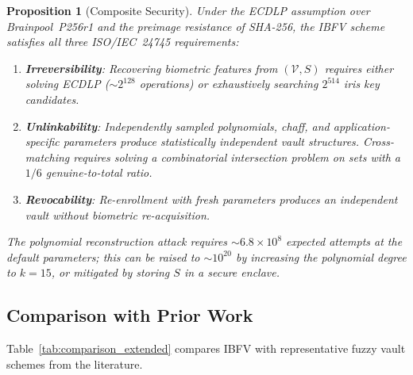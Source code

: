 \documentclass[3p,twocolumn]{elsarticle}
\newtheorem{proposition}{Proposition}
\newcommand{\IBFV}{\textsf{IBFV}}
\begin{document}
\begin{proposition}[Composite Security]
Under the ECDLP assumption over Brainpool~P256r1 and the preimage resistance of SHA-256, the \IBFV{} scheme satisfies all three ISO/IEC~24745 requirements:
\begin{enumerate}
    \item \textbf{Irreversibility}: Recovering biometric features from $(\mathcal{V}, S)$ requires either solving ECDLP ($\sim\!2^{128}$ operations) or exhaustively searching $2^{514}$ iris key candidates.
    \item \textbf{Unlinkability}: Independently sampled polynomials, chaff, and application-specific parameters produce statistically independent vault structures. Cross-matching requires solving a combinatorial intersection problem on sets with a $1/6$ genuine-to-total ratio.
    \item \textbf{Revocability}: Re-enrollment with fresh parameters produces an independent vault without biometric re-acquisition.
\end{enumerate}
The polynomial reconstruction attack requires $\sim\!6.8 \times 10^{8}$ expected attempts at the default parameters; this can be raised to $\sim\!10^{20}$ by increasing the polynomial degree to $k = 15$, or mitigated by storing $S$ in a secure enclave.
\end{proposition}

\subsection{Comparison with Prior Work}
\label{sec:comparison}

Table~\ref{tab:comparison_extended} compares \IBFV{} with representative fuzzy vault schemes from the literature.
\end{document}
